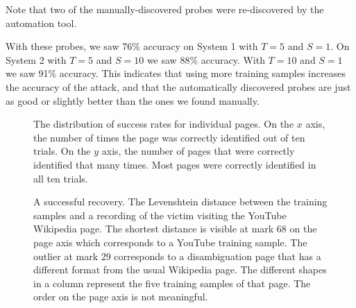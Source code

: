 \documentclass[letterpaper,twocolumn,10pt]{article}
\begin{document}
Note that two of the manually-discovered probes were re-discovered by the
automation tool.

With these probes, we saw 76\% accuracy on System 1 with $T=5$ and
$S=1$. On System 2 with $T=5$
and $S=10$ we saw 88\% accuracy. With $T=10$ and
$S=1$ we saw 91\% accuracy. This indicates that using
more training samples increases the accuracy of the attack, and that the
automatically discovered probes are just as good or slightly better than the
ones we found manually.

\begin{figure}
    \centering
    \caption{The distribution of success rates for individual pages. On the $x$
        axis, the number of times the page was correctly identified out of ten
        trials. On the $y$ axis, the number of pages that were correctly
        identified that many times. Most pages were correctly identified in all
        ten trials.}
    \label{figure:distribution}
\end{figure}

\begin{figure*}
    \centering
    
    \caption{A successful recovery. The Levenshtein distance between the
    training samples and a recording of the victim visiting the YouTube
    Wikipedia page. The shortest distance is visible at mark 68 on the page axis
    which corresponds to a YouTube training sample. The outlier at mark 29
    corresponds to a disambiguation page that has a different format from the
usual Wikipedia page. The different shapes in a column represent the five
training samples of that page. The order on the page axis is not meaningful.}
    \label{figure:youtube}
\end{figure*}
\end{document}
